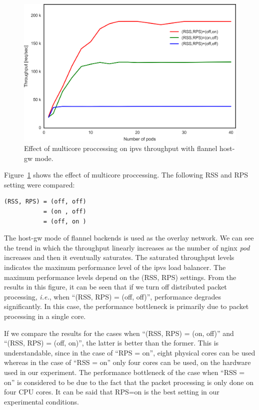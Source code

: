 \begin{figure}
  \centering
  \includegraphics[width=0.8\columnwidth]{Figs/ipvs_mcore_proccessing}
  \caption{Effect of multicore proccessing on ipvs throughput with flannel host-gw mode.}
  \label{fig:ipvs_mcore_proccessing}
\end{figure}

Figure~\ref{fig:ipvs_mcore_proccessing} shows the effect of multicore proccessing.
The following RSS and RPS setting were compared: 

\begin{center}
  \centering
  \begin{minipage}{0.8\columnwidth}
\begin{verbatim}
(RSS, RPS) = (off, off)
           = (on , off)
           = (off, on )
\end{verbatim}
  \end{minipage}
\end{center}

The host-gw mode of flannel backends is used as the overlay network.
We can see the trend in which the throughput linearly increases as the number of nginx {\em pod} increases and then it eventually saturates.
The saturated throughput levels indicates the maximum performance level of the ipvs load balancer.
The maximum performance levels depend on the (RSS, RPS) settings.
From the results in this figure, it can be seen that if we turn off distributed packet processing,
{\it i.e.}, when \enquote{(RSS, RPS) = (off, off)}, performance degrades significantly.
In this case, the performance bottleneck is primarily due to packet processing in a single core.

If we compare the results for the cases when \enquote{(RSS, RPS) = (on, off)} and \enquote{(RSS, RPS) = (off, on)},
the latter is better than the former.
This is understandable, since in the case of \enquote{RPS = on}, eight physical cores can be used whereas 
in the case of \enquote{RSS = on} only four cores can be used, on the hardware used in our experiment.
The performance bottleneck of the case when \enquote{RSS = on} is considered 
to be due to the fact that the packet processing is only done on four CPU cores.
It can be said that RPS=on is the best setting in our experimental conditions.


